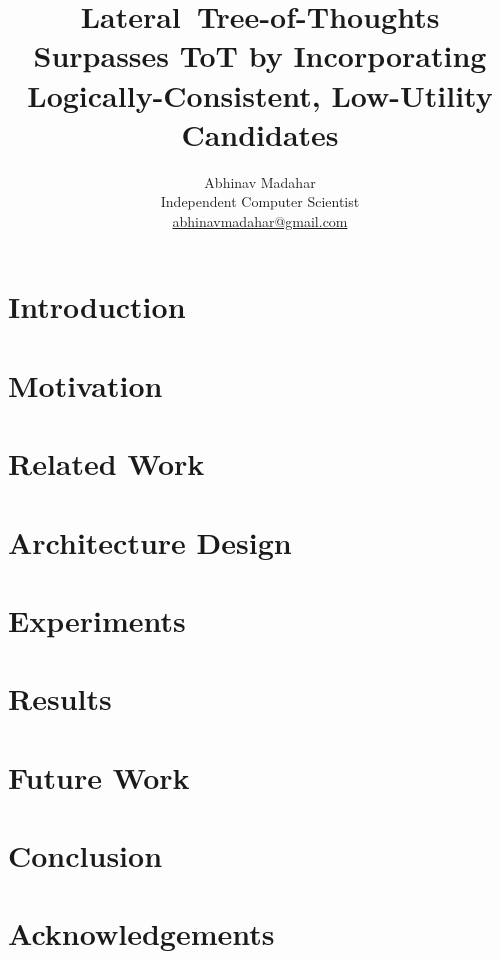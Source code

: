 \documentclass{article}
\title{Lateral~Tree\mbox{-}of\mbox{-}Thoughts Surpasses ToT by Incorporating Logically\mbox{-}Consistent, Low\mbox{-}Utility Candidates}
\author{Abhinav Madahar \\ Independent Computer Scientist \\ \href{mailto:abhinavmadahar@gmail.com}{abhinavmadahar@gmail.com}}
\begin{document}
\maketitle

\begin{abstract}
\end{abstract}

\section{Introduction}
\label{section:introduction}

\section{Motivation}
\label{section:motivation}

\section{Related Work}
\label{section:prior-work}

\section{Architecture Design}
\label{section:architecture-design}

\section{Experiments}
\label{section:experiments}

\section{Results}
\label{section:results}

\section{Future Work}
\label{section:future-work}

\section{Conclusion}
\label{section:conclusion}

\ificlrfinal
\section*{Acknowledgements}
\fi


\end{document}
